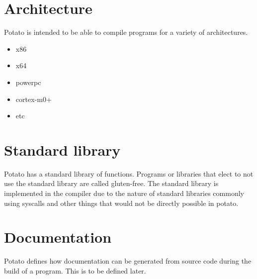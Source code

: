 \documentclass[12pt]{article}
\begin{document}
\section{Architecture}
Potato is intended to be able to compile programs for a variety of architectures.
\begin{itemize}
\item x86
\item x64
\item powerpc
\item cortex-m0+
\item etc
\end{itemize}

\section {Standard library}
Potato has a standard library of functions. Programs or libraries that elect to not use the standard library are called gluten-free. The standard library is implemented in the compiler due to the nature of standard libraries commonly using syscalls and other things that would not be directly possible in potato.

\section {Documentation}
Potato defines how documentation can be generated from source code during the build of a program. This is to be defined later.
\end{document}
